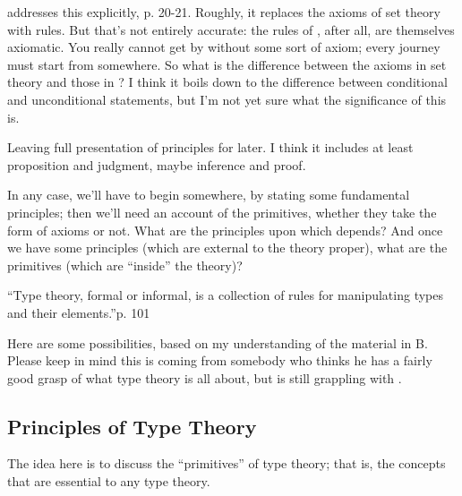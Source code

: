 \begin{ednote}
  \HoTTB addresses this explicitly, p. 20-21.  Roughly, it replaces
  the axioms of set theory with rules.  But that's not entirely
  accurate: the rules of \HoTT, after all, are themselves axiomatic.
  You really cannot get by without some sort of axiom; every journey
  must start from somewhere.  So what is the difference between the
  axioms in set theory and those in \tth?  I think it boils down to
  the difference between conditional and unconditional statements, but
  I'm not yet sure what the significance of this is.
\end{ednote}

\begin{ednote}
  Leaving full presentation of principles for later.  I think it
  includes at least proposition and judgment, maybe inference and
  proof.
\end{ednote}

In any case, we'll have to begin somewhere, by stating some
fundamental principles; then we'll need an account of the primitives,
whether they take the form of axioms or not.  What are the principles
upon which \HoTT{} depends?  And once we have some principles (which are
external to the theory proper), what are the primitives (which are
``inside'' the theory)?


\begin{ednote}
  ``Type theory, formal or informal, is a collection of rules for
  manipulating types and their elements.''\HoTTB p. 101
\end{ednote}

Here are some possibilities, based on my understanding of the material
in \HoTT{}B.  Please keep in mind this is coming from somebody who
thinks he has a fairly good grasp of what type theory is all about,
but is still grappling with \HoTT{}.

\subsection{Principles of Type Theory}
\label{subs:hottprinciples}

\begin{ednote}
  The idea here is to discuss the ``primitives'' of type theory; that
  is, the concepts that are essential to any type theory.
\end{ednote}


